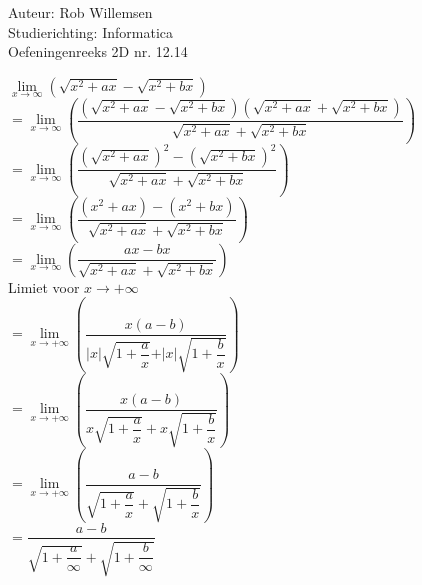 \documentclass[a4paper]{article}
\begin{document}
\noindent \large Auteur: Rob Willemsen \\
\noindent \large Studierichting: Informatica\\
\noindent \large Oefeningenreeks 2D nr. 12.14\\

\medskip

\normalsize

$\lim\limits_{x \rightarrow \infty} \left(\sqrt{x^2 + ax} - \sqrt{x^2 + bx}\right)$ \\

$= \lim\limits_{x \rightarrow \infty} \left(\dfrac{(\sqrt{x^2 + ax} - \sqrt{x^2 + bx})(\sqrt{x^2 + ax} + \sqrt{x^2 + bx})}{\sqrt{x^2 + ax} + \sqrt{x^2 + bx}}\right)$ \\

$= \lim\limits_{x \rightarrow \infty} \left(\dfrac{(\sqrt{x^2 + ax})^2 - (\sqrt{x^2 + bx})^2}{\sqrt{x^2 + ax} + \sqrt{x^2 + bx}}\right)$ \\

$= \lim\limits_{x \rightarrow \infty} \left(\dfrac{(x^2 + ax) - (x^2 + bx)}{\sqrt{x^2 + ax} + \sqrt{x^2 + bx}}\right)$ \\

$= \lim\limits_{x \rightarrow \infty} \left(\dfrac{ax - bx}{\sqrt{x^2 + ax} + \sqrt{x^2 + bx}}\right)$ \\

Limiet voor $x \rightarrow +\infty$ \\

$= \lim\limits_{x \rightarrow +\infty} \left(\dfrac{x(a - b)}{\vert x \vert \sqrt{1 + \dfrac{a}{x}} + \vert x \vert \sqrt{1 + \dfrac{b}{x}}}\right)$ \\



$= \lim\limits_{x \rightarrow +\infty} \left(\dfrac{x(a - b)}{x\sqrt{1 + \dfrac{a}{x}} + x\sqrt{1 + \dfrac{b}{x}}}\right)$ \\

$= \lim\limits_{x \rightarrow +\infty} \left(\dfrac{a - b}{\sqrt{1 + \dfrac{a}{x}} + \sqrt{1 + \dfrac{b}{x}}}\right)$ \\

$= \dfrac{a - b}{\sqrt{1 + \dfrac{a}{\infty}} + \sqrt{1 + \dfrac{b}{\infty}}}$ \\
\end{document}

